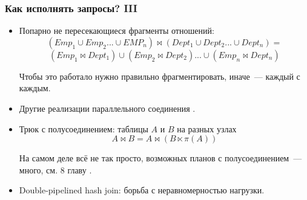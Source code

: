 \documentclass{beamer}
\begin{document}
\begin{frame}
\frametitle{Как исполнять запросы? III}

\begin{itemize}
  \setlength\itemsep{1em}

  \item Попарно не пересекающиеся фрагменты отношений: 
  $$(Emp_1 \cup Emp_2 ... \cup EMP_n) \bowtie (Dept_1 \cup Dept_2 ... \cup Dept_n) =$$ $$(Emp_1 \bowtie Dept_1) \cup (Emp_2 \bowtie Dept_2) ... \cup (Emp_n \bowtie Dept_n)$$
  
  Чтобы это работало нужно правильно фрагментировать, иначе~--- каждый с каждым.
  
  \item Другие реализации параллельного соединения \cite{Taniar2008}.

  \item Трюк с полусоединением: таблицы $A$ и $B$ на разных узлах \\
  $$A \bowtie B = A \bowtie (B \ltimes \pi (A))$$

  На самом деле всё не так просто, возможных планов с полусоединением~--- много, см. 8 главу \cite{Ozsu2011}.

  \item Double-pipelined hash join: борьба с неравномерностью нагрузки.

\end{itemize}

\end{frame}
\end{document}
